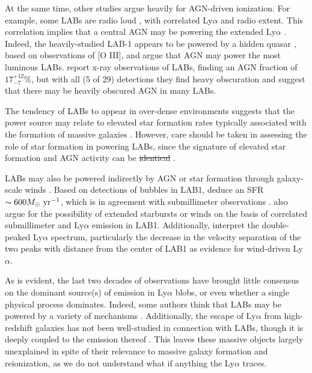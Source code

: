 At the same time, other studies argue heavily for AGN-driven ionization.
For example, some LABs are radio loud \citep{Miley2008}, with correlated Ly$\alpha$ and radio extent.
This correlation implies that a central AGN may be powering the extended Ly$\alpha$ \citep{vanOjik1997}.
Indeed, the heavily-studied LAB-1 appears to be powered by a hidden quasar \citep{Overzier2013}, based on observations of \textsc{[O III]}, and argue that AGN may power the most luminous LABs.
\citet{Geach2009} report x-ray observations of LABs, finding an AGN fraction of $17^{+12}_{-7}\%$, but with all (5 of 29) detections they find heavy obscuration and suggest that there may be heavily obscured AGN in many LABs.

The tendency of LABs to appear in over-dense environments \citep{Matsuda2009,Matsuda2011,Prescott2008} suggests that the power source may relate to elevated star formation rates typically associated with the formation of massive galaxies \citep[e.g.][]{Matsuda2007,Kubo2013,Hine2016,Alexander2016}.
However, care should be taken in assessing the role of star formation in powering LABs, since the signature of elevated star formation and AGN activity can be  \sout{identical} \citep{Webb2009}.

LABs may also be powered indirectly by AGN or star formation through galaxy-scale winds \citep{Wilman2005}.
Based on detections of bubbles in LAB1, \citet{Matsuda2004} deduce an SFR $\sim 600M_{\odot}\ \rm{yr}^{-1}$, which is in agreement with submillimeter observations \citep{Chapman2001}.
\citet{Matsuda2007} also argue for the possibility of extended starbursts or winds on the basis of correlated submillimeter and Ly$\alpha$ emission in LAB1.
Additionally, \citet{Ohyama2003} interpret the double-peaked Ly$\alpha$ spectrum, particularly the decrease in the velocity separation of the two peaks with distance from the center of LAB1 as evidence for wind-driven Ly$\alpha$.

As is evident, the last two decades of observations have brought little consensus on the dominant source(s) of emission in Ly$\alpha$ blobs, or even whether a single physical process dominates.
Indeed, some authors think that LABs may be powered by a variety of mechanisms \citep{Scarlata2009,Webb2009,Nilsson2006,Prescott2009,Ao2015}.
Additionally, the escape of Ly$\alpha$ from high-redshift galaxies has not been well-studied in connection with LABs, though it is deeply coupled to the emission thereof \citep{Smith2019}.
This leaves these massive objects largely unexplained in spite of their relevance to massive galaxy formation and reionization, as we do not understand what if anything the Ly$\alpha$ traces.

